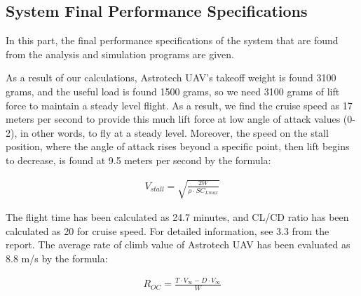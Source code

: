 \documentclass[12pt]{article}
\begin{document}
\subsection{System Final Performance Specifications}
In this part, the final performance specifications of the system that are found from the analysis and simulation programs are given.


\justify
As a result of our calculations, Astrotech UAV’s takeoff weight is found 3100 grams, and the useful load is found 1500 grams, so we need 3100 grams of lift force to maintain a steady level flight. As a result, we find the cruise speed as 17 meters per second to provide this much lift force at low angle of attack values (0-2), in other words, to fly at a steady level. Moreover, the speed on the stall position, where the angle of attack rises beyond a specific point, then lift begins to decrease, is found at 9.5 meters per second by the formula:

\begin{align}
	V_{stall} = \sqrt{ \frac{2W}{\rho \cdot S C_{L max}}} 
\end{align}

\justify
The flight time has been calculated as 24.7 minutes, and CL/CD ratio has been calculated as 20 for cruise speed. For detailed information, see 3.3 from the report.
\justify
The average rate of climb value of Astrotech UAV has been evaluated as 8.8 m/s by the formula:

\begin{align}
	R_{OC} = \frac{T \cdot V_\infty - D \cdot V_\infty}{W}
\end{align}
\end{document}
